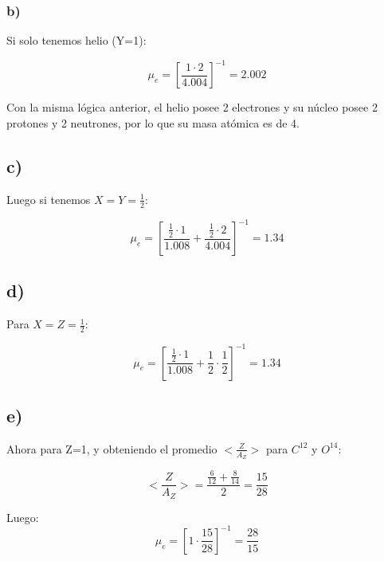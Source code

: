 \documentclass[2pt]{article}
\begin{document}
\subsubsection*{b)}

Si solo tenemos helio (Y=1):

\begin{equation}
\mu_e=[\frac{1\cdot 2}{4.004}]^{-1}=2.002
\end{equation}

Con la misma lógica anterior, el helio posee 2 electrones y su núcleo posee 2 protones y 2 neutrones, por lo que su masa atómica es de 4.

\subsection*{c)}


Luego si tenemos $X=Y=\frac{1}{2}$:

\begin{equation}
\mu_e=[\frac{\frac{1}{2}\cdot 1}{1.008} + \frac{\frac{1}{2} \cdot 2}{4.004}]^{-1}=1.34
\end{equation}


\subsection*{d)}

Para $X=Z=\frac{1}{2}$:

\begin{equation}
\mu_e=[\frac{\frac{1}{2}\cdot 1}{1.008} + \frac{1}{2} \cdot \frac{1}{2}]^{-1}=1.34
\end{equation}

\subsection*{e)}

Ahora para Z=1, y obteniendo el promedio $<\frac{Z}{A_Z}>$ para $C^{12}$ y $O^{14}$:

\begin{equation}
<\frac{Z}{A_Z}>=\frac{\frac{6}{12}+\frac{8}{14}}{2}=\frac{15}{28}
\end{equation}

Luego:
\begin{equation}
\mu_e=[1\cdot \frac{15}{28}]^{-1}=\frac{28}{15}
\end{equation}

\section{}
\newpage
\end{document}
